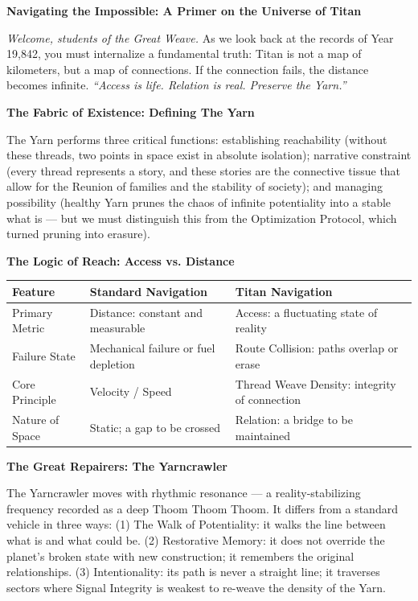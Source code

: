 \documentclass[11pt]{article}
\begin{document}
\begin{archivebox}
\textcolor{archiveGold}{\textbf{Navigating the Impossible: A Primer on the Universe of Titan}}\\[6pt]
\small

\textit{Welcome, students of the Great Weave.} As we look back at the records of Year 19,842, you must internalize a fundamental truth: Titan is not a map of kilometers, but a map of connections. If the connection fails, the distance becomes infinite. \textit{``Access is life. Relation is real. Preserve the Yarn.''}

\textbf{The Fabric of Existence: Defining The Yarn}

The Yarn performs three critical functions: establishing reachability (without these threads, two points in space exist in absolute isolation); narrative constraint (every thread represents a story, and these stories are the connective tissue that allow for the Reunion of families and the stability of society); and managing possibility (healthy Yarn prunes the chaos of infinite potentiality into a stable what is --- but we must distinguish this from the Optimization Protocol, which turned pruning into erasure).

\textbf{The Logic of Reach: Access vs. Distance}

\begin{center}
\begin{tabular}{lll}
\toprule
\textbf{Feature} & \textbf{Standard Navigation} & \textbf{Titan Navigation} \\
\midrule
Primary Metric & Distance: constant and measurable & Access: a fluctuating state of reality \\
Failure State & Mechanical failure or fuel depletion & Route Collision: paths overlap or erase \\
Core Principle & Velocity / Speed & Thread Weave Density: integrity of connection \\
Nature of Space & Static; a gap to be crossed & Relation: a bridge to be maintained \\
\bottomrule
\end{tabular}
\end{center}

\textbf{The Great Repairers: The Yarncrawler}

The Yarncrawler moves with rhythmic resonance --- a reality-stabilizing frequency recorded as a deep Thoom Thoom Thoom. It differs from a standard vehicle in three ways: (1) The Walk of Potentiality: it walks the line between what is and what could be. (2) Restorative Memory: it does not override the planet's broken state with new construction; it remembers the original relationships. (3) Intentionality: its path is never a straight line; it traverses sectors where Signal Integrity is weakest to re-weave the density of the Yarn.


\end{archivebox}
\end{document}
